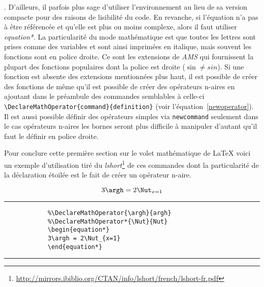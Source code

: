 	. D'ailleurs, il parfois plus sage d'utiliser l'environnement au lieu de sa version compacte pour des raisons de lisibilité du code. En revanche, si l'équation n'a pas à être référencée et qu'elle est plus ou moins complexe, alors il faut utiliser \textit{equation*}. La particularité du mode mathématique est que toutes les lettres sont prises comme des variables et sont ainsi imprimées en italique, mais souvent les fonctions sont en police droite. Ce sont les extensions de \textit{AMS} qui fournissent la plupart des fonctions populaires dont la police est droite ($\sin \neq sin$). %
	Si une fonction est absente des extensions mentionnées plus haut, il est possible de créer des fonctions de même qu'il est possible de créer des opérateurs n-aires en ajoutant dans le préambule des commandes semblables à celle-ci
	\verb|\DeclareMathOperator{command}{definition}| (voir l'équation~\ref{newoperator}). Il est aussi possible définir des opérateurs simples via \verb|newcommand| seulement dans le cas opérateurs n-aires les bornes seront plus difficile à manipuler d'autant qu'il faut le définir en police droite.  
%
	\par Pour conclure cette première section sur le volet mathématique de \LaTeX{} voici un exemple d'utilisation tiré du \textit{lshort}\footnote{\url{http://mirrors.ibiblio.org/CTAN/info/lshort/french/lshort-fr.pdf}} de ces commandes dont la particularité de la déclaration étoilée est le fait de créer un opérateur n-aire.
%	
	\begin{table}[H]
		\begin{equation}\label{newoperator}
		3\argh = 2\Nut_{x=1}
		\end{equation}
		\hrule
		\begin{verbatim}
			%\DeclareMathOperator{\argh}{argh}
			%\DeclareMathOperator*{\Nut}{Nut}
			\begin{equation*}
			3\argh = 2\Nut_{x=1}
			\end{equation*}
		\end{verbatim}
		\hrule
	\end{table}
%